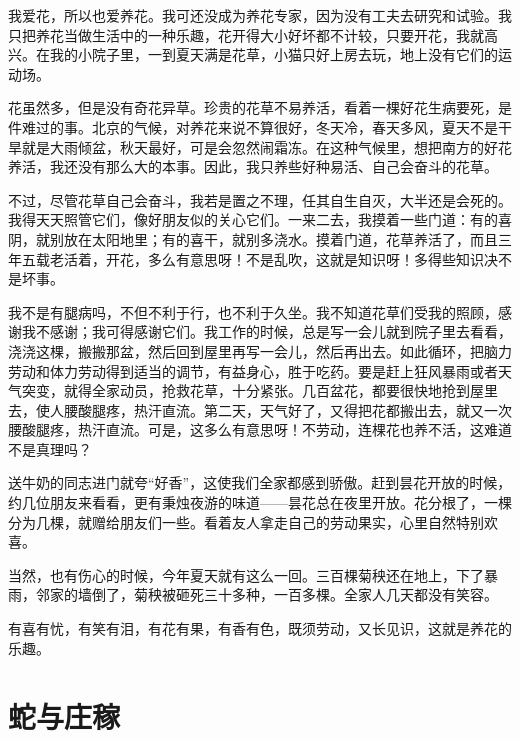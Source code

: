 \documentclass[12pt,UTF-8,openany]{ctexbook}
\begin{document}
\begin{large}
    
    我爱花，所以也爱养花。我可还没成为养花专家，因为没有工夫去研究和试验。我只把养花当做生活中的一种乐趣，花开得大小好坏都不计较，只要开花，我就高兴。在我的小院子里，一到夏天满是花草，小猫只好上房去玩，地上没有它们的运动场。
    
    花虽然多，但是没有奇花异草。珍贵的花草不易养活，看着一棵好花生病要死，是件难过的事。北京的气候，对养花来说不算很好，冬天冷，春天多风，夏天不是干旱就是大雨倾盆，秋天最好，可是会忽然闹霜冻。在这种气候里，想把南方的好花养活，我还没有那么大的本事。因此，我只养些好种易活、自己会奋斗的花草。
    
    不过，尽管花草自己会奋斗，我若是置之不理，任其自生自灭，大半还是会死的。我得天天照管它们，像好朋友似的关心它们。一来二去，我摸着一些门道：有的喜阴，就别放在太阳地里；有的喜干，就别多浇水。摸着门道，花草养活了，而且三年五载老活着，开花，多么有意思呀！不是乱吹，这就是知识呀！多得些知识决不是坏事。
    
    我不是有腿病吗，不但不利于行，也不利于久坐。我不知道花草们受我的照顾，感谢我不感谢；我可得感谢它们。我工作的时候，总是写一会儿就到院子里去看看，浇浇这棵，搬搬那盆，然后回到屋里再写一会儿，然后再出去。如此循环，把脑力劳动和体力劳动得到适当的调节，有益身心，胜于吃药。要是赶上狂风暴雨或者天气突变，就得全家动员，抢救花草，十分紧张。几百盆花，都要很快地抢到屋里去，使人腰酸腿疼，热汗直流。第二天，天气好了，又得把花都搬出去，就又一次腰酸腿疼，热汗直流。可是，这多么有意思呀！不劳动，连棵花也养不活，这难道不是真理吗？
    
    送牛奶的同志进门就夸“好香”，这使我们全家都感到骄傲。赶到昙花开放的时候，约几位朋友来看看，更有秉烛夜游的味道——昙花总在夜里开放。花分根了，一棵分为几棵，就赠给朋友们一些。看着友人拿走自己的劳动果实，心里自然特别欢喜。
    
    当然，也有伤心的时候，今年夏天就有这么一回。三百棵菊秧还在地上，下了暴雨，邻家的墙倒了，菊秧被砸死三十多种，一百多棵。全家人几天都没有笑容。
    
    有喜有忧，有笑有泪，有花有果，有香有色，既须劳动，又长见识，这就是养花的乐趣。
    
\end{large}



\chapter{蛇与庄稼}
\end{document}
